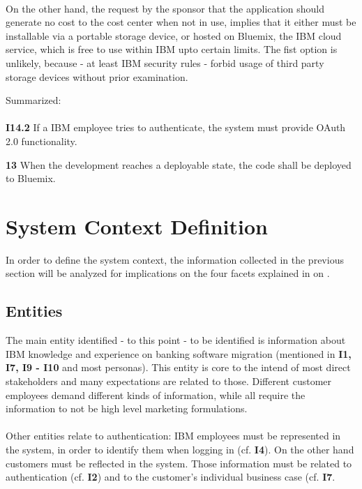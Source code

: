 \paragraph{} On the other hand, the request by the sponsor that the application should generate no cost to the cost center when not in use, implies that it either must be installable via a portable storage device, or hosted on Bluemix, the IBM cloud service, which is free to use within IBM upto certain limits. The fist option is unlikely, because - at least IBM security rules - forbid usage of third party storage devices without prior examination.

Summarized: 

\paragraph{}
\begin{closeItem}
\item [\textbf{I14.2}] If a IBM employee tries to authenticate, the system must provide OAuth 2.0 functionality. 
\item[\textbf{13}] When the development reaches a deployable state, the code shall be deployed to Bluemix.
\end{closeItem}
\section{System Context Definition}
In order to define the system context, the information collected in the previous section will be analyzed for implications on the four facets explained in \Cref{} on \cpagerefrange{}{}.

\subsection{Entities}
The main entity identified - to this point - to be identified is information about IBM knowledge and experience on banking software migration (mentioned in \textbf{I1, I7, I9 - I10} and most personas). This entity is core to the intend of most direct stakeholders and many expectations are related to those. Different customer employees demand different kinds of information, while all require the information to not be high level marketing formulations.

\paragraph{} Other entities relate to authentication: IBM employees must be represented in the system, in order to identify them when logging in (cf. \textbf{I4}). On the other hand customers must be reflected in the system. Those information must be related to authentication (cf. \textbf{I2}) and to the customer's individual business case (cf. \textbf{I7}. 
